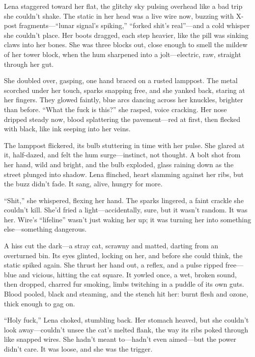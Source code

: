 \documentclass[12pt]{book}
\begin{document}
Lena staggered toward her flat, the glitchy sky pulsing overhead like a bad trip she couldn’t shake. The static in her head was a live wire now, buzzing with X-post fragments---``lunar signal's spiking,'' ``forked shit's real''---and a cold whisper she couldn’t place. Her boots dragged, each step heavier, like the pill was sinking claws into her bones. She was three blocks out, close enough to smell the mildew of her tower block, when the hum sharpened into a jolt---electric, raw, straight through her gut.

She doubled over, gasping, one hand braced on a rusted lamppost. The metal scorched under her touch, sparks snapping free, and she yanked back, staring at her fingers. They glowed faintly, blue arcs dancing across her knuckles, brighter than before. ``What the fuck is this?'' she rasped, voice cracking. Her nose dripped steady now, blood splattering the pavement---red at first, then flecked with black, like ink seeping into her veins.

The lamppost flickered, its bulb stuttering in time with her pulse. She glared at it, half-dazed, and felt the hum surge---instinct, not thought. A bolt shot from her hand, wild and bright, and the bulb exploded, glass raining down as the street plunged into shadow. Lena flinched, heart slamming against her ribs, but the buzz didn’t fade. It sang, alive, hungry for more.

``Shit,'' she whispered, flexing her hand. The sparks lingered, a faint crackle she couldn’t kill. She’d fried a light---accidentally, sure, but it wasn’t random. It was her. Wire’s ``lifeline'' wasn’t just waking her up; it was turning her into something else---something dangerous.

A hiss cut the dark---a stray cat, scrawny and matted, darting from an overturned bin. Its eyes glinted, locking on her, and before she could think, the static spiked again. She thrust her hand out, a reflex, and a pulse ripped free---blue and vicious, hitting the cat square. It yowled once, a wet, broken sound, then dropped, charred fur smoking, limbs twitching in a puddle of its own guts. Blood pooled, black and steaming, and the stench hit her: burnt flesh and ozone, thick enough to gag on.

``Holy fuck,'' Lena choked, stumbling back. Her stomach heaved, but she couldn’t look away---couldn’t unsee the cat’s melted flank, the way its ribs poked through like snapped wires. She hadn’t meant to---hadn’t even aimed---but the power didn’t care. It was loose, and she was the trigger.
\end{document}
